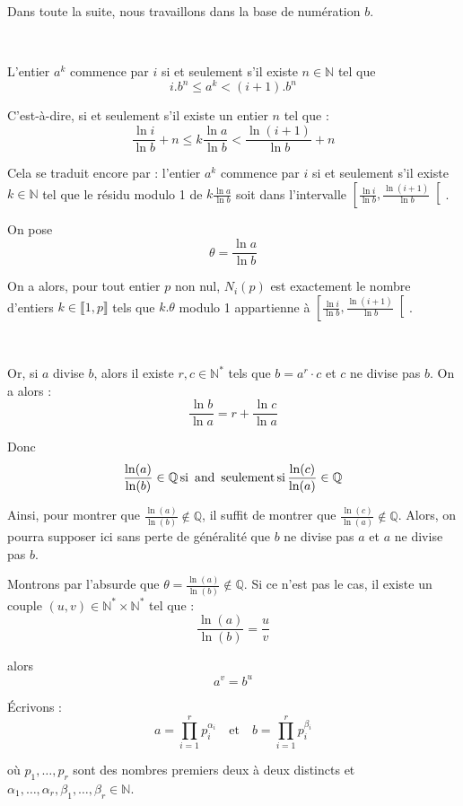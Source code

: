 \

Dans toute la suite, nous travaillons dans la base de num{\'e}ration $b$.

\

L'entier $a^k$ commence par $i$ si et seulement s'il existe $n \in
\mathbb{N}$ tel que
\[ i.b^n \leq a^k < (i + 1) .b^n \]


C'est-{\`a}-dire, si et seulement s'il existe un entier $n$ tel que :
\[ \frac{\ln i}{\ln b} + n \leq k \frac{\ln a}{\ln b} < \frac{\ln (i + 1)}{\ln
   b} + n \]


Cela se traduit encore par : l'entier $a^k$ commence par $i$ si et seulement
s'il existe $k \in \mathbb{N}$ tel que le r{\'e}sidu modulo 1 de $k \frac{\ln
a}{\ln b}$ soit dans l'intervalle $ \left[ \frac{\ln i}{\ln b}, \frac{\ln (i +
1)}{\ln b} \right[$.

On pose
\[ \theta = \frac{\ln a}{\ln b} \]


On a alors, pour tout entier $p$ non nul, $N_i (p)$ est exactement le nombre
d'entiers $k \in \llbracket 1, p \rrbracket$ tels que $k. \theta$ modulo 1
appartienne {\`a} $\left[ \frac{\ln i}{\ln b}, \frac{\ln (i + 1)}{\ln b}
\right[$.

\

Or, si $a$ divise $b$, alors il existe $r, c \in \mathbb{N^{\ast}}$ tels que
$b = a^r \cdot c$ et $c$ ne divise pas $b$. On a alors :
\[ \frac{\ln b}{\ln a} = r + \frac{\ln c}{\ln a} \]


Donc
\[ \frac{\ln (a)}{\ln (b)} \in \mathbb{Q} \operatorname{si} \text{ and } \operatorname{seulement}
   \operatorname{si} \frac{\ln (c)}{\ln (a)} \in \mathbb{Q} \]


Ainsi, pour montrer que $\frac{\ln (a)}{\ln (b)} \nin \mathbb{Q}$, il suffit
de montrer que $\frac{\ln (c)}{\ln (a)} \nin \mathbb{Q}$. Alors, on pourra
supposer ici sans perte de g{\'e}n{\'e}ralit{\'e} que $b$ ne divise pas $a$ et
$a$ ne divise pas $b$.

Montrons par l'absurde que $\theta = \frac{\ln (a)}{\ln (b)} \nin \mathbb{Q}$.
Si ce n'est pas le cas, il existe un couple $(u, v) \in \mathbb{N^{\ast}}
\times \mathbb{N^{\ast}}$ tel que :
\[ \frac{\ln (a)}{\ln (b)} = \frac{u}{v} \]


alors
\[ a^v = b^u \]


{\'E}crivons :
\[ a = \prod_{i = 1}^r p_i^{\alpha_i}  \quad \text{et} \quad b = \prod_{i =
   1}^r p_i^{\beta_i} \]


o{\`u} $p_1, \ldots, p_r$ sont des nombres premiers deux {\`a} deux distincts
et $\alpha_1, \ldots, \alpha_r, \beta_1, \ldots, \beta_r \in \mathbb{N}$.

